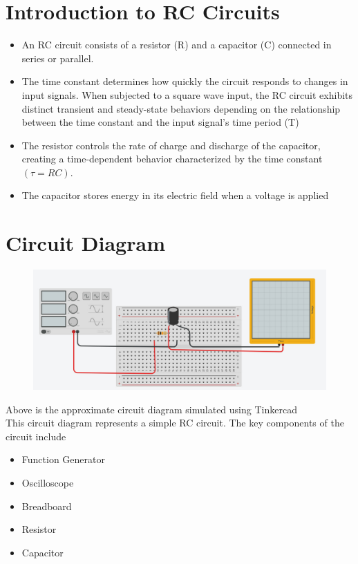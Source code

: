 \documentclass[journal]{IEEEtran}
\begin{document}
\section{Introduction to RC Circuits}
\begin{itemize}
    \item An RC circuit consists of a resistor (R) and a capacitor (C) connected in series or parallel. 
    \item The time constant determines how quickly the circuit responds to changes in input signals. When subjected to a square wave input, the RC circuit exhibits distinct transient and steady-state behaviors depending on the relationship between the time constant and the input signal's time period (T)
    \item The resistor controls the rate of charge and discharge of the capacitor, creating a time-dependent behavior characterized by the time constant $(\tau = RC)$.
\end{itemize}
\begin{itemize}
    \item The capacitor stores energy in its electric field when a voltage is applied
\end{itemize}
\section{Circuit Diagram}

\begin{figure}[H]
    \centering
    \includegraphics[width=\linewidth]{figs/circuitdiagram.jpeg}
    \label{1}
\end{figure}
Above is the approximate circuit diagram simulated using Tinkercad\\
This circuit diagram represents a simple RC circuit. The key components of the circuit include
\begin{itemize}
    \item Function Generator
    \item Oscilloscope
    \item Breadboard 
    \item Resistor 
    \item Capacitor 
\end{itemize}
\end{document}
